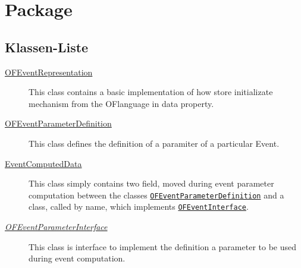 
\chapter[Package ontologyFramework.OFEventManagement]{Package }\label{ontologyFramework.OFEventManagement-package}



\section{Klassen-Liste}
\begin{description}
\item[{\hyperlink{ontologyFramework.OFEventManagement.OFEventRepresentation-class}{OFEventRepresentation}}]
This class contains a basic implementation of how store initializate mechanism
 from the OFlanguage in data property.
\hfill\pageref{ontologyFramework.OFEventManagement.OFEventRepresentation-class}

\item[{\hyperlink{ontologyFramework.OFEventManagement.OFEventParameterDefinition-class}{OFEventParameterDefinition}}]
This class defines the definition of a paramiter of a particular Event.
\hfill\pageref{ontologyFramework.OFEventManagement.OFEventParameterDefinition-class}

\item[{\hyperlink{ontologyFramework.OFEventManagement.EventComputedData-class}{EventComputedData}}]
This class simply contains two field, moved during event parameter computation
 between the classes \texttt{\hyperlink{ontologyFramework.OFEventManagement.OFEventParameterDefinition-class}{OFEventParameterDefinition}} and a
 class,  called by name, which implements \texttt{\hyperlink{ontologyFramework.OFEventManagement.OFLogicalEventManagement.OFEventInterface-class}{OFEventInterface}}.
\hfill\pageref{ontologyFramework.OFEventManagement.EventComputedData-class}

\item[{\textit{\hyperlink{ontologyFramework.OFEventManagement.OFEventParameterInterface-class}{OFEventParameterInterface}}}]
This class is interface to implement the definition a parameter to be used
 during event computation.
\hfill\pageref{ontologyFramework.OFEventManagement.OFEventParameterInterface-class}

\end{description}
